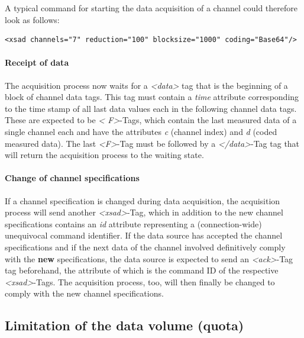 \documentclass[a4paper,12pt,BCOR6mm,bibtotoc,idxtotoc]{scrbook}
\begin{document}
A typical command for starting the data acquisition of a channel could
therefore look as follows:

\begin{lstlisting}[basicstyle=\ttfamily\scriptsize]
<xsad channels="7" reduction="100" blocksize="1000" coding="Base64"/>
\end{lstlisting}

\paragraph{Receipt of data} The acquisition process now waits for a
\textit{\textless data\textgreater} tag that is the beginning of a block of
channel data tags. This tag must contain a \textit{time} attribute
corresponding to the time stamp of all last data values each in the following
channel data tags. These are expected to be \textit{\textless
F\textgreater}-Tags, which contain the last measured data of a single channel
each and have the attributes \textit{c} (channel index) and \textit{d} (coded
measured data). The last \textit{\textless F\textgreater}-Tag must be followed
by a \textit{\textless /data\textgreater}-Tag  tag that will return the
acquisition process to the waiting state.

\paragraph{Change of channel specifications} If a channel specification is
changed during data acquisition, the acquisition process will send another
\textit{\textless xsad\textgreater}-Tag, which in addition to the new channel
specifications contains an \textit{id} attribute representing a
(connection-wide) unequivocal command identifier. If the data source has
accepted the channel specifications and if the next data of the channel
involved definitively comply with the \textbf{new} specifications, the data
source is expected to send an \textit{\textless ack\textgreater}-Tag  tag
beforehand, the attribute of which is the command ID of the respective
\textit{\textless xsad\textgreater}-Tags. The acquisition process, too, will
then finally be changed to comply with the new channel specifications.


\subsection{Limitation of the data volume (quota)}
\label{sec:dlsd_logger_quota}
\end{document}
